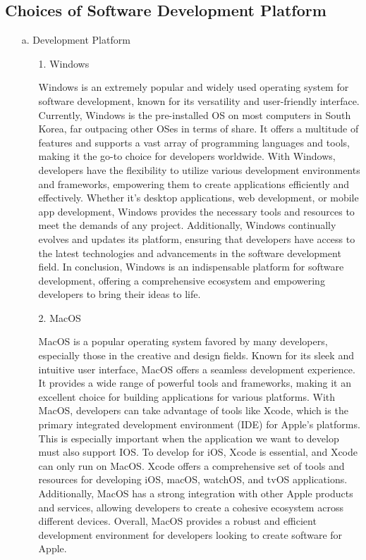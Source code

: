 \documentclass[conference, a4paper]{IEEEtran}
\begin{document}
\subsection{Choices of Software Development Platform}
\begin{enumerate}
    \item[a.] Development Platform
    
    \begin{enumerate}
    \item[1.] Windows
    \item[] Windows is an extremely popular and widely used operating system for software development, known for its versatility and user-friendly interface. Currently, Windows is the pre-installed OS on most computers in South Korea, far outpacing other OSes in terms of share. It offers a multitude of features and supports a vast array of programming languages and tools, making it the go-to choice for developers worldwide. With Windows, developers have the flexibility to utilize various development environments and frameworks, empowering them to create applications efficiently and effectively. Whether it's desktop applications, web development, or mobile app development, Windows provides the necessary tools and resources to meet the demands of any project. Additionally, Windows continually evolves and updates its platform, ensuring that developers have access to the latest technologies and advancements in the software development field. In conclusion, Windows is an indispensable platform for software development, offering a comprehensive ecosystem and empowering developers to bring their ideas to life. \\

    \item[2.] MacOS 
    \item[] MacOS is a popular operating system favored by many developers, especially those in the creative and design fields. Known for its sleek and intuitive user interface, MacOS offers a seamless development experience. It provides a wide range of powerful tools and frameworks, making it an excellent choice for building applications for various platforms. With MacOS, developers can take advantage of tools like Xcode, which is the primary integrated development environment (IDE) for Apple's platforms. This is especially important when the application we want to develop must also support IOS. To develop for iOS, Xcode is essential, and Xcode can only run on MacOS. Xcode offers a comprehensive set of tools and resources for developing iOS, macOS, watchOS, and tvOS applications. Additionally, MacOS has a strong integration with other Apple products and services, allowing developers to create a cohesive ecosystem across different devices. Overall, MacOS provides a robust and efficient development environment for developers looking to create software for Apple. \\
    \end{enumerate}


\end{enumerate}
\end{document}
